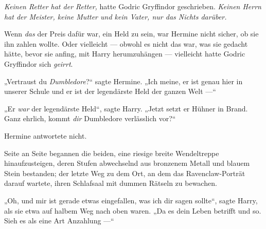 \emph{Keinen Retter hat der Retter,} hatte Godric Gryffindor geschrieben. \emph{Keinen Herrn hat der Meister, keine Mutter und kein Vater, nur das Nichts darüber.}

Wenn \emph{das} der Preis dafür war, ein Held zu sein, war Hermine nicht sicher, ob sie ihn zahlen wollte. Oder vielleicht — obwohl es nicht das war, was sie gedacht hätte, bevor sie anfing, mit Harry herumzuhängen — vielleicht hatte Godric Gryffindor sich \emph{geirrt}.

„Vertraust du \emph{Dumbledore}?“ sagte Hermine.
„Ich meine, er ist genau hier in unserer Schule und er ist der legendärste Held der ganzen Welt —“

„Er \emph{war} der legendärste Held“, sagte Harry.
„Jetzt setzt er Hühner in Brand. Ganz ehrlich, kommt \emph{dir} Dumbledore verlässlich vor?“

Hermine antwortete nicht.

Seite an Seite begannen die beiden, eine riesige breite Wendeltreppe hinaufzusteigen, deren Stufen abwechselnd aus bronzenem Metall und blauem Stein bestanden; der letzte Weg zu dem Ort, an dem das Ravenclaw-Porträt darauf wartete, ihren Schlafsaal mit dummen Rätseln zu bewachen.

„Oh, und mir ist gerade etwas eingefallen, was ich dir sagen sollte“, sagte Harry, als sie etwa auf halbem Weg nach oben waren.
„Da es dein Leben betrifft und so. Sieh es als eine Art Anzahlung —“

